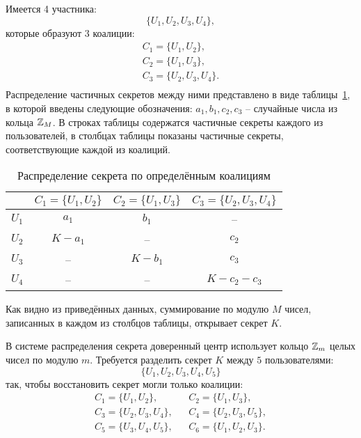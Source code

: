 \example
Имеется 4 участника:
    \[ \{ U_1, U_2, U_3, U_4 \}, \]
которые образуют 3 коалиции:
\[ \begin{array}{l}
    C_1 = \{ U_1, U_2 \}, \\
    C_2 = \{ U_1, U_3 \}, \\
    C_3 = \{ U_2, U_3, U_4 \}. \\
\end{array} \]
Распределение частичных секретов между ними представлено в виде таблицы~\ref{tab:secret-share-coalition-1}, в которой введены следующие обозначения: $a_1, b_1, c_2, c_3$ -- случайные числа из кольца $\mathbb{Z}_M$. В строках таблицы содержатся частичные секреты каждого из пользователей, в столбцах таблицы показаны частичные секреты, соответствующие каждой из коалиций.

\begin{table}[!ht]
    \centering
    \caption{Распределение секрета по определённым коалициям\label{tab:secret-share-coalition-1}}
    \begin{tabular}{|c||c|c|c|}
        \hline
              & $C_1 = \{ U_1, U_2 \}$ & $C_2 = \{U_1, U_3 \}$ & $C_3 = \{ U_2, U_3, U_4 \}$ \\
        \hline \hline
        $U_1$ & $a_1$     & $b_1$     & -- \\
        $U_2$ & $K - a_1$ & --        & $c_2$ \\
        $U_3$ & --        & $K - b_1$ & $c_3$  \\
        $U_4$ & --        & --        & $K - c_2 - c_3$ \\
        \hline
    \end{tabular}
\end{table}

Как видно из приведённых данных, суммирование по модулю $M$ чисел, записанных в каждом из столбцов таблицы, открывает секрет $K$.
\exampleend


\example

В системе распределения секрета доверенный
центр использует кольцо $\mathbb{Z}_m$ целых чисел по модулю $m$. Требуется разделить секрет $K$ между $5$ пользователями:
    \[ \{ U_1, U_2, U_3, U_4, U_5 \} \]
так, чтобы восстановить секрет могли только коалиции:
\[ \begin{array}{lll}
    C_1 = \{ U_1, U_2 \},      & & C_2 = \{ U_1, U_3 \}, \\
    C_3 = \{ U_2, U_3, U_4 \}, & & C_4 = \{ U_2, U_3, U_5 \}, \\
    C_5 = \{ U_3, U_4, U_5 \}, & & C_6 = \{ U_1, U_2, U_3 \}. \\
\end{array} \]

